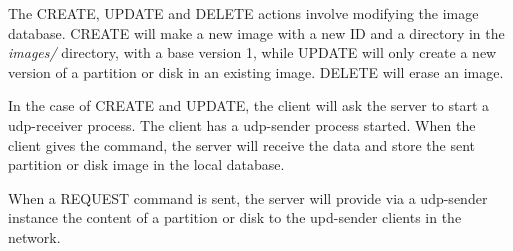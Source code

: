 The CREATE, UPDATE and DELETE actions involve modifying  the image
database. CREATE will make a new image with a new ID and a directory in the
\emph{images/} directory, with a base version 1, while UPDATE will only
create a new version of a partition or disk in an existing image. DELETE
will erase an image.

In the case of CREATE and UPDATE, the client will ask the server to start a
udp-receiver process. The client has a udp-sender process started. When the
client gives the command, the server will receive the data and store the
sent partition or disk image in the local database.

When a REQUEST command is sent, the server will provide via a udp-sender
instance the content of a partition or disk to the upd-sender clients in
the network.
